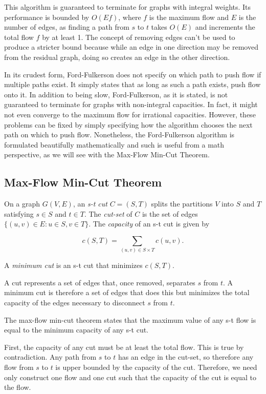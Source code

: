 This algorithm is guaranteed to terminate for graphs with integral weights. Its performance is bounded by $O(Ef)$, where $f$ is the maximum flow and $E$ is the number of edges, as finding a path from $s$ to $t$ takes $O(E)$ and increments the total flow $f$ by at least 1. The concept of removing edges can't be used to produce a stricter bound because while an edge in one direction may be removed from the residual graph, doing so creates an edge in the other direction.

In its crudest form, Ford-Fulkerson does not specify on which path to push flow if multiple paths exist. It simply states that as long as such a path exists, push flow onto it. In addition to being slow, Ford-Fulkerson, as it is stated, is not guaranteed to terminate for graphs with non-integral capacities. In fact, it might not even converge to the maximum flow for irrational capacities. However, these problems can be fixed by simply specifying how the algorithm chooses the next path on which to push flow. Nonetheless, the Ford-Fulkerson algorithm is formulated beautifully mathematically and such is useful from a math perspective, as we will see with the Max-Flow Min-Cut Theorem.

\subsection{Max-Flow Min-Cut Theorem}

On a graph $G(V,E)$, an \textit{s-t cut} $C=(S,T)$ splits the partitions $V$ into $S$ and $T$ satisfying $s \in S$ and $t \in T$. The \textit{cut-set} of $C$ is the set of edges $\{(u,v) \in E : u \in S, v \in T\}$. The \textit{capacity} of an s-t cut is given by

\[c(S,T) = \sum_{(u,v) \in S \times T}c(u,v).\]

A \textit{minimum cut} is an s-t cut that minimizes $c(S,T)$.

A cut represents a set of edges that, once removed, separates $s$ from $t$. A minimum cut is therefore a set of edges that does this but minimizes the total capacity of the edges necessary to disconnect $s$ from $t$.

The max-flow min-cut theorem states that the maximum value of any s-t flow is equal to the minimum capacity of any s-t cut.

First, the capacity of any cut must be at least the total flow. This is true by contradiction. Any path from $s$ to $t$ has an edge in the cut-set, so therefore any flow from $s$ to $t$ is upper bounded by the capacity of the cut. Therefore, we need only construct one flow and one cut such that the capacity of the cut is equal to the flow.


